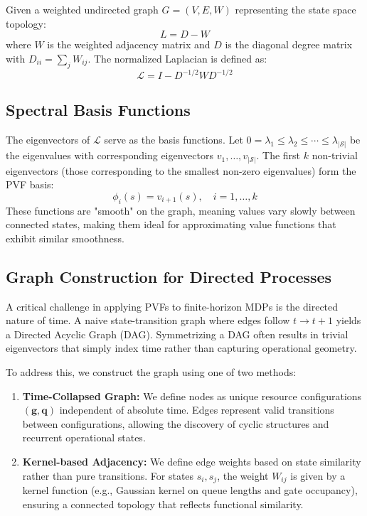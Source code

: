 Given a weighted undirected graph $G = (V, E, W)$ representing the state space topology:
%
\begin{equation}
	L = D - W
\end{equation}
%
where $W$ is the weighted adjacency matrix and $D$ is the diagonal degree matrix with $D_{ii} = \sum_j W_{ij}$.
The normalized Laplacian is defined as:
%
\begin{equation}
	\mathcal{L} = I - D^{-1/2} W D^{-1/2}
\end{equation}

\subsection{Spectral Basis Functions}

The eigenvectors of $\mathcal{L}$ serve as the basis functions. Let $0 = \lambda_1 \leq \lambda_2 \leq \cdots \leq \lambda_{|\mathcal{S}|}$ be the eigenvalues with corresponding eigenvectors $v_1, \ldots, v_{|\mathcal{S}|}$.
The first $k$ non-trivial eigenvectors (those corresponding to the smallest non-zero eigenvalues) form the PVF basis:
%
\begin{equation}
	\phi_i(s) = v_{i+1}(s), \quad i = 1, \ldots, k
\end{equation}
These functions are "smooth" on the graph, meaning values vary slowly between connected states, making them ideal for approximating value functions that exhibit similar smoothness.

\subsection{Graph Construction for Directed Processes}

A critical challenge in applying PVFs to finite-horizon MDPs is the directed nature of time. A naive state-transition graph where edges follow $t \to t+1$ yields a Directed Acyclic Graph (DAG). Symmetrizing a DAG often results in trivial eigenvectors that simply index time rather than capturing operational geometry.

To address this, we construct the graph using one of two methods:
\begin{enumerate}
	\item \textbf{Time-Collapsed Graph:} We define nodes as unique resource configurations $(\mathbf{g}, \mathbf{q})$ independent of absolute time. Edges represent valid transitions between configurations, allowing the discovery of cyclic structures and recurrent operational states.
	\item \textbf{Kernel-based Adjacency:} We define edge weights based on state similarity rather than pure transitions. For states $s_i, s_j$, the weight $W_{ij}$ is given by a kernel function (e.g., Gaussian kernel on queue lengths and gate occupancy), ensuring a connected topology that reflects functional similarity.
\end{enumerate}

